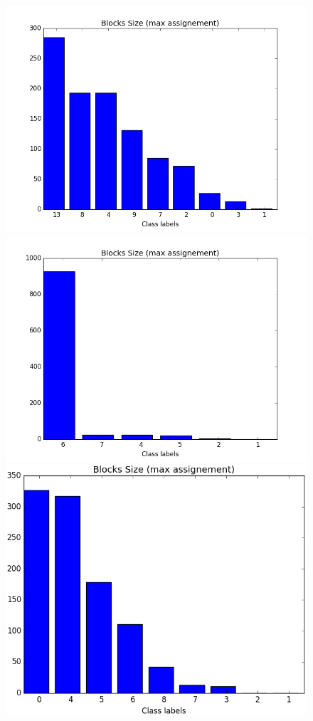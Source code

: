 \begin{figure}[ht]
	\endminipage
		\vspace{-0.28cm}
	\includegraphics[scale=0.27]{img/M_g_peaks/figure_5}
	\endminipage
	\includegraphics[scale=0.27]{img/M_g_power_law/figure_5} 
	\endminipage
	\includegraphics[scale=0.27]{img/M_g_regular/figure_5}
	\endminipage


\end{figure}
